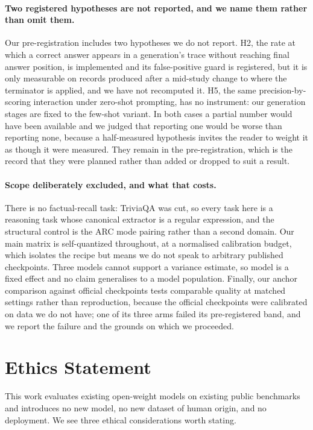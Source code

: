 \documentclass[conference]{IEEEtran}
\begin{document}
\paragraph{Two registered hypotheses are not reported, and we name them rather than omit them.}
Our pre-registration includes two hypotheses we do not report. H2, the rate at
which a correct answer appears in a generation's trace without reaching final
answer position, is implemented and its false-positive guard is registered, but it
is only measurable on records produced after a mid-study change to where the
terminator is applied, and we have not recomputed it. H5, the same
precision-by-scoring interaction under zero-shot prompting, has no instrument: our
generation stages are fixed to the few-shot variant. In both cases a partial
number would have been available and we judged that reporting one would be worse
than reporting none, because a half-measured hypothesis invites the reader to
weight it as though it were measured. They remain in the pre-registration, which
is the record that they were planned rather than added or dropped to suit a result.

\paragraph{Scope deliberately excluded, and what that costs.}
There is no factual-recall task: TriviaQA was cut, so every task here is a
reasoning task whose canonical extractor is a regular expression, and the
structural control is the ARC mode pairing rather than a second domain. Our main
matrix is self-quantized throughout, at a normalised calibration budget, which
isolates the recipe but means we do not speak to arbitrary published checkpoints.
Three models cannot support a variance estimate, so model is a fixed effect and no
claim generalises to a model population. Finally, our anchor comparison against
official checkpoints tests comparable quality at matched settings rather than
reproduction, because the official checkpoints were calibrated on data we do not
have; one of its three arms failed its pre-registered band, and we report the
failure and the grounds on which we proceeded.

\section*{Ethics Statement}
\label{sec:ethics}

This work evaluates existing open-weight models on existing public benchmarks
and introduces no new model, no new dataset of human origin, and no deployment.
We see three ethical considerations worth stating.
\end{document}
